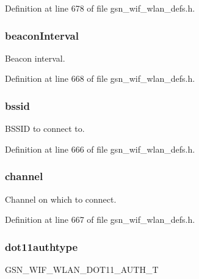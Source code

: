 Definition at line 678 of file gsn\_\-wif\_\-wlan\_\-defs.h.

\hypertarget{a00374_a54a6c03695574d9381214937f9dc6d57}{
\subsubsection[{beaconInterval}]{ {\bf beaconInterval}}}
\label{a00374_a54a6c03695574d9381214937f9dc6d57}
Beacon interval. 

Definition at line 668 of file gsn\_\-wif\_\-wlan\_\-defs.h.

\hypertarget{a00374_a1d70c2c8895c2763bdede85266c38318}{
\subsubsection[{bssid}]{ {\bf bssid}}}
\label{a00374_a1d70c2c8895c2763bdede85266c38318}
BSSID to connect to. 

Definition at line 666 of file gsn\_\-wif\_\-wlan\_\-defs.h.

\hypertarget{a00374_a52d69a3bd7bdfdfc6f9e40f4962c575d}{
\subsubsection[{channel}]{ {\bf channel}}}
\label{a00374_a52d69a3bd7bdfdfc6f9e40f4962c575d}
Channel on which to connect. 

Definition at line 667 of file gsn\_\-wif\_\-wlan\_\-defs.h.

\hypertarget{a00374_aae6f1d203042b11df814ffc52e3bb9df}{
\subsubsection[{dot11authtype}]{ {\bf dot11authtype}}}
\label{a00374_aae6f1d203042b11df814ffc52e3bb9df}
GSN\_\-WIF\_\-WLAN\_\-DOT11\_\-AUTH\_\-T 

